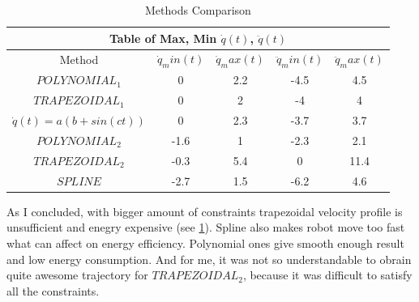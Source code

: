 \documentclass[12pt, a4paper]{report}
\begin{document}
\begin{table}[H]
\centering
\begin{tabular}{ |c||c||c||c||c| }
 \hline
 \multicolumn{5}{|c|}{Table of Max, Min $\dot{q}(t)$, $\ddot{q}(t)$} \\
 \hline
 Method & $\dot{q}_min(t)$ & $\dot{q}_max(t)$ & $\ddot{q}_min(t)$ & $\ddot{q}_max(t)$\\
 \hline
 $POLYNOMIAL_1$ & 0 & 2.2 & -4.5 & 4.5\\
 $TRAPEZOIDAL_1$ & 0 & 2 & -4 & 4\\
 $\dot{q}(t) = a(b + sin(ct))$ & 0 & 2.3 & -3.7 & 3.7\\
 $POLYNOMIAL_2$ & -1.6 & 1 & -2.3 & 2.1\\
 $TRAPEZOIDAL_2$ & -0.3 & 5.4 & 0 & 11.4\\
 $SPLINE$ & -2.7 & 1.5 & -6.2 & 4.6\\
 \hline
\end{tabular}
\caption{Methods Comparison}
\label{table:1}
\end{table}
 
 As I concluded, with bigger amount of constraints trapezoidal velocity profile is unsufficient and enegry expensive (see \ref{table:1}). Spline also makes robot move too fast what can affect on energy efficiency. Polynomial ones give smooth enough result and low energy consumption. And for me, it was not so understandable to obrain quite awesome trajectory for $TRAPEZOIDAL_2$, because it was difficult to satisfy all the constraints.
 
\end{document}
